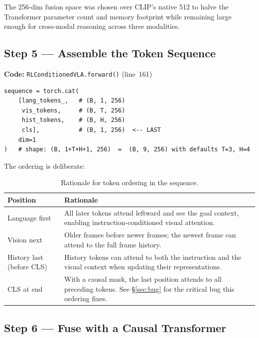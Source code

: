 \documentclass[12pt, a4paper]{article}
\begin{document}
The 256-dim fusion space was chosen over CLIP's native 512 to halve the
Transformer parameter count and memory footprint while remaining large enough
for cross-modal reasoning across three modalities.

\subsection{Step 5 — Assemble the Token Sequence}
\label{sec:step5}

\textbf{Code:} \texttt{RLConditionedVLA.forward()} (line~161)

\begin{lstlisting}[style=Python, caption={Token sequence assembly (forward pass).}]
sequence = torch.cat(
    [lang_tokens_,   # (B, 1, 256)
     vis_tokens,     # (B, T, 256)
     hist_tokens,    # (B, H, 256)
     cls],           # (B, 1, 256)  <-- LAST
    dim=1
)   # shape: (B, 1+T+H+1, 256)  =  (B, 9, 256) with defaults T=3, H=4
\end{lstlisting}

The ordering is deliberate:

\begin{table}[h]
\centering
\caption{Rationale for token ordering in the sequence.}
\begin{tabular}{L{2.5cm} L{9cm}}
\toprule
\textbf{Position} & \textbf{Rationale} \\
\midrule
Language first & All later tokens attend leftward and see the goal context,
                 enabling instruction-conditioned visual attention. \\
Vision next     & Older frames before newer frames; the newest frame can
                 attend to the full frame history. \\
History last (before CLS)
                & History tokens can attend to both the instruction and the
                 visual context when updating their representations. \\
CLS at end      & With a causal mask, the last position attends to all
                 preceding tokens.
                 See §\ref{sec:bug} for the critical bug this ordering fixes. \\
\bottomrule
\end{tabular}
\end{table}

\subsection{Step 6 — Fuse with a Causal Transformer}
\label{sec:step6}
\end{document}
